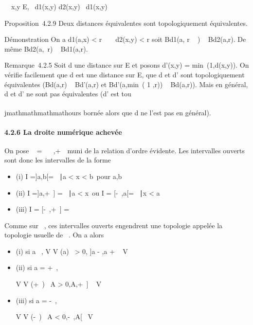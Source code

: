 \forall~~x,y \in E,\quad
\alpha~d1(x,y) \leq d2(x,y) \leq \beta~d1(x,y)

Proposition~4.2.9 Deux distances équivalentes sont topologiquement
équivalentes.

Démonstration On a d1(a,x) \textless{} r
\over \beta~ \rigtharrow~ d2(x,y) \textless{} r soit
Bd1(a, r \over \beta~ ) \subset~
Bd2(a,r). De même Bd2(a,\alpha~r) \subset~
Bd1(a,r).

Remarque~4.2.5 Soit d une distance sur E et posons d'(x,y)
= min~(1,d(x,y)). On vérifie facilement que d
est une distance sur E, que d et d' sont topologiquement équivalentes
(Bd(a,r) \subset~ Bd'(a,r) et
Bd'(a,min~( 1  ,r)) \subset~ Bd(a,r)). Mais en général, d et d' ne sont pas
équivalentes (d' est tou\\\\jmathmathmathmathours bornée alors que d ne l'est pas en
général).

\paragraph{4.2.6 La droite numérique achevée}

On pose \overline{}~ = ~
\cup\-\infty~,+\infty~\ muni de la relation d'ordre
évidente. Les intervalles ouverts sont donc les intervalles de la forme

\begin{itemize}
\itemsep1pt\parskip0pt
\item
  (i) I ={]}a,b{[}= \x \in {}~∣a
  \textless{} x \textless{} b\ pour a,b
  \in\overline{}~
\item
  (ii) I ={]}a,+\infty~{]} = \x
  \in\overline{}~∣a
  \textless{} x\ ou I = {[}-\infty~,a{[}= \x
  \in\overline{}~∣x
  \textless{} a\
\item
  (iii) I = {[}-\infty~,+\infty~{]} = \overline{}~
\end{itemize}

Comme sur ~, ces intervalles ouverts engendrent une topologie appelée la
topologie usuelle de \overline\mathbb{R}~. On a alors

\begin{itemize}
\item
  (i) si a \in {}~, V \in V (a) \Leftrightarrow
  \exists~\epsilon \textgreater{} 0,\quad
  {]}a - \epsilon,a + \epsilon{[}\subset~ V
\item
  (ii) si a = +\infty~,

  V \in V (+\infty~) \Leftrightarrow \exists~A
  \textgreater{} 0,\quad {]}A,+\infty~{]} \subset~ V
\item
  (iii) si a = -\infty~,

  V \in V (-\infty~) \Leftrightarrow \exists~A
  \textless{} 0,\quad {[}-\infty~,A{[}\subset~ V
\end{itemize}

